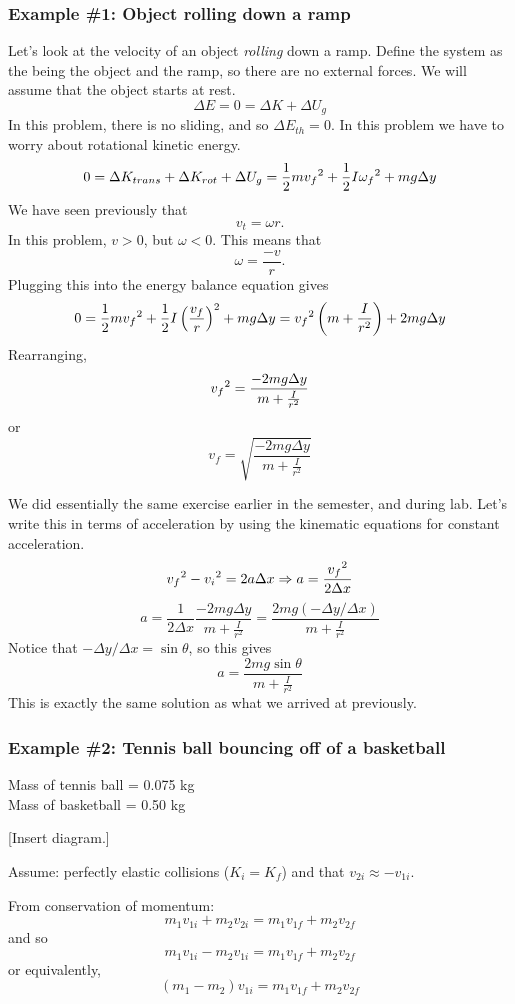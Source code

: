 \subsubsection*{Example \#1: Object rolling down a ramp}
Let's look at the velocity of an object {\it rolling} down a ramp. Define the system as the being the object and the ramp, so there are no external forces. We will assume that the object starts at rest.
$$\Delta{E}=0=\Delta{K}+\Delta{U_g}$$
In this problem, there is no sliding, and so $\Delta{E_{th}}=0$. In this problem we have to worry about rotational kinetic energy.
$$0=\Delta{K_{trans}}+\Delta{K_{rot}}+\Delta{U_g}=\frac{1}{2}mv_f\displaystyle^2+\frac{1}{2}I\omega_f\displaystyle^2+mg\Delta y$$
We have seen previously that 
$$v_t=\omega r.$$
In this problem, $v>0$, but $\omega<0$. This means that 
$$\omega=\frac{-v}{r}.$$
Plugging this into the energy balance equation gives
$$0=\frac{1}{2}mv_f\displaystyle^2+\frac{1}{2}I\left(\frac{v_f}{r}\right)^2+mg\Delta y=v_f\displaystyle^2\left(m+\frac{I}{r^2}\right)+2mg\Delta{y}$$
Rearranging,
$$v_f\displaystyle^2=\frac{-2mg\Delta{y}}{m+\frac{I}{r^2}}$$
or
$$\boxed{v_f=\sqrt{\frac{-2mg\Delta{y}}{m+\frac{I}{r^2}}}}$$

We did essentially the same exercise earlier in the semester, and during lab. Let's write this in terms of acceleration by using the kinematic equations for constant acceleration.
$$v_f\displaystyle^2-v_i\displaystyle^2=2a\Delta{x}\Rightarrow a=\frac{v_f\displaystyle^2}{2\Delta{x}}$$
$$a=\frac{1}{2\Delta{x}}\frac{-2mg\Delta{y}}{m+\frac{I}{r^2}}=\frac{2mg(-\Delta{y}/\Delta{x})}{m+\frac{I}{r^2}}$$
Notice that $-\Delta{y}/\Delta{x}=\sin\theta$, so this gives
$$\boxed{a=\frac{2mg\sin\theta}{m+\frac{I}{r^2}}}$$
This is exactly the same solution as what we arrived at previously.

\subsubsection*{Example \#2: Tennis ball bouncing off of a basketball}
Mass of tennis ball = 0.075 kg\\
Mass of basketball = 0.50 kg

[Insert diagram.]
\vspace{5cm}

Assume: perfectly elastic collisions ($K_i=K_f$) and that $v_{2i}\approx -v_{1i}$.

From conservation of momentum:
$$m_1v_{1i}+m_2v_{2i}=m_1v_{1f}+m_2v_{2f}$$
and so
$$m_1v_{1i}-m_2v_{1i}=m_1v_{1f}+m_2v_{2f}$$
or equivalently,
$$\boxed{(m_1-m_2)v_{1i}=m_1v_{1f}+m_2v_{2f}}$$

